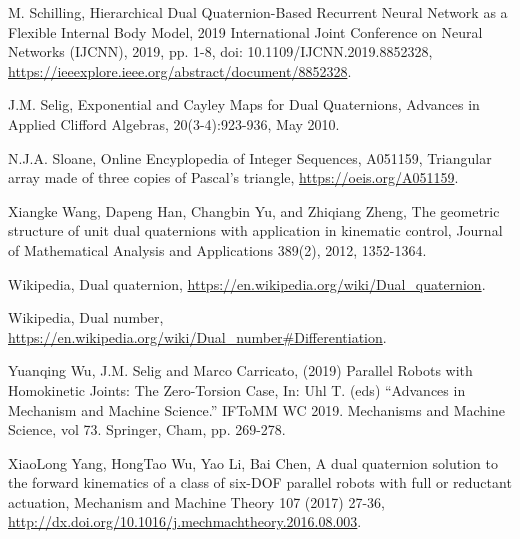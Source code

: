 \documentclass[12pt,reqno]{amsart}
\begin{document}
\begin{thebibliography}{99}
 M. Schilling, Hierarchical Dual Quaternion-Based Recurrent Neural Network as a Flexible Internal Body Model, 2019 International Joint Conference on Neural Networks (IJCNN), 2019, pp. 1-8, doi: 10.1109/IJCNN.2019.8852328, \url{https://ieeexplore.ieee.org/abstract/document/8852328}.

 J.M. Selig, Exponential and Cayley Maps for Dual Quaternions, Advances in Applied Clifford Algebras, 20(3-4):923-936, May 2010.

 N.J.A. Sloane, Online Encyplopedia of Integer Sequences, A051159, Triangular array made of three copies of Pascal's triangle, \url{https://oeis.org/A051159}.

 Xiangke Wang, Dapeng Han, Changbin Yu, and Zhiqiang Zheng, The geometric structure of unit dual quaternions with application in kinematic control, Journal of Mathematical Analysis and Applications 389(2), 2012, 1352-1364.

 Wikipedia, Dual quaternion, \url{https://en.wikipedia.org/wiki/Dual_quaternion}.

 Wikipedia, Dual number, \url{https://en.wikipedia.org/wiki/Dual_number#Differentiation}.

 Yuanqing Wu, J.M. Selig and Marco Carricato,  (2019) Parallel
Robots with Homokinetic Joints: The Zero-Torsion Case, In: Uhl T. (eds) ``Advances in Mechanism and Machine Science.'' IFToMM WC 2019. Mechanisms and Machine Science, vol 73. Springer, Cham, pp. 269-278.

 XiaoLong Yang, HongTao Wu, Yao Li, Bai Chen, A dual quaternion solution to the forward kinematics of a class of six-DOF parallel robots with full or reductant actuation, Mechanism and Machine Theory 107 (2017) 27-36, \url{http://dx.doi.org/10.1016/j.mechmachtheory.2016.08.003}.
\end{thebibliography}
\end{document}
